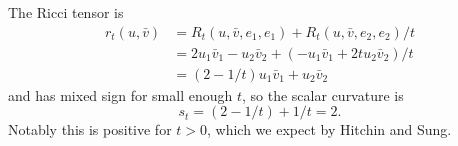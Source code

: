 \documentclass[10pt,a4paper]{amsart}
\begin{document}
The Ricci tensor is
\begin{align*}
r_t(u,\bar v)
&= R_t(u, \bar v, e_1, e_1) + R_t(u,\bar v, e_2, e_2) / t
\\
&= 2 u_1 \bar v_1 - u_2 \bar v_2 + (-u_1 \bar v_1 + 2t u_2 \bar v_2)/t
\\
&= (2-1/t) u_1 \bar v_1 + u_2 \bar v_2
\end{align*}
and has mixed sign for small enough $t$,
so the scalar curvature is
$$
s_t
= (2-1/t) + 1/t = 2.
$$
Notably this is positive for $t > 0$, which we expect by Hitchin and Sung.






\end{document}
